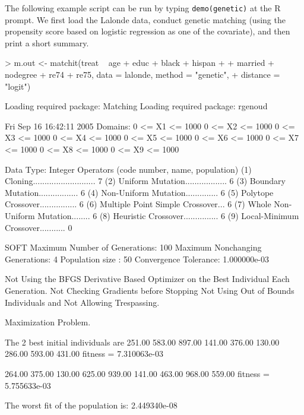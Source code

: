 \documentclass[oneside,letterpaper,titlepage]{article}
\begin{document}
The following example script can be run by typing {\tt demo(genetic)}
at the R prompt.  We first load the Lalonde data, conduct genetic
matching (using the propensity score based on logistic regression as
one of the covariate), and then print a short summary.
\begin{Schunk}
\begin{Sinput}
> m.out <- matchit(treat ~ age + educ + black + hispan + 
+     married + nodegree + re74 + re75, data = lalonde, method = "genetic", 
+     distance = "logit")
\end{Sinput}
\begin{Soutput}
Loading required package: Matching
Loading required package: rgenoud


Fri Sep 16 16:42:11 2005
Domains:
 0   <=  X1   <=    1000 
 0   <=  X2   <=    1000 
 0   <=  X3   <=    1000 
 0   <=  X4   <=    1000 
 0   <=  X5   <=    1000 
 0   <=  X6   <=    1000 
 0   <=  X7   <=    1000 
 0   <=  X8   <=    1000 
 0   <=  X9   <=    1000 

Data Type: Integer
Operators (code number, name, population) 
	(1) Cloning........................... 	7
	(2) Uniform Mutation.................. 	6
	(3) Boundary Mutation................. 	6
	(4) Non-Uniform Mutation.............. 	6
	(5) Polytope Crossover................ 	6
	(6) Multiple Point Simple Crossover... 	6
	(7) Whole Non-Uniform Mutation........ 	6
	(8) Heuristic Crossover............... 	6
	(9) Local-Minimum Crossover........... 	0

SOFT Maximum Number of Generations: 100
Maximum Nonchanging Generations: 4
Population size       : 50
Convergence Tolerance: 1.000000e-03

Not Using the BFGS Derivative Based Optimizer on the Best Individual Each Generation.
Not Checking Gradients before Stopping
Not Using Out of Bounds Individuals and Not Allowing Trespassing.



Maximization Problem.



The 2 best initial individuals are
251.00	583.00	897.00	141.00	376.00	130.00	286.00	593.00	431.00	
fitness = 7.310063e-03

264.00	375.00	130.00	625.00	939.00	141.00	463.00	968.00	559.00	
fitness = 5.755633e-03


The worst fit of the population is: 2.449340e-08



\end{Soutput}
\end{Schunk}
\end{document}
